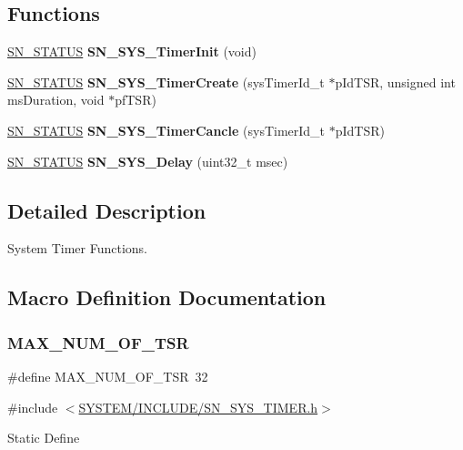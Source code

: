 \subsection*{Functions}
\begin{DoxyCompactItemize}
\item 
\mbox{\label{group__SYSTEM__TIMER_gabe15a62b1e228b796d3a2297c085c9ef}} 
\hyperlink{group__SYSTEM__ERROR_ga4540713b9a7a18ce44d78c3a10f7442f}{S\+N\+\_\+\+S\+T\+A\+T\+US} {\bfseries S\+N\+\_\+\+S\+Y\+S\+\_\+\+Timer\+Init} (void)
\item 
\mbox{\label{group__SYSTEM__TIMER_ga1d85ad6b65ffc1c7a3fd35361b33aa08}} 
\hyperlink{group__SYSTEM__ERROR_ga4540713b9a7a18ce44d78c3a10f7442f}{S\+N\+\_\+\+S\+T\+A\+T\+US} {\bfseries S\+N\+\_\+\+S\+Y\+S\+\_\+\+Timer\+Create} (sys\+Timer\+Id\+\_\+t $\ast$p\+Id\+T\+SR, unsigned int ms\+Duration, void $\ast$pf\+T\+SR)
\item 
\mbox{\label{group__SYSTEM__TIMER_gaa004347fdd0940a882a77729feaf60c4}} 
\hyperlink{group__SYSTEM__ERROR_ga4540713b9a7a18ce44d78c3a10f7442f}{S\+N\+\_\+\+S\+T\+A\+T\+US} {\bfseries S\+N\+\_\+\+S\+Y\+S\+\_\+\+Timer\+Cancle} (sys\+Timer\+Id\+\_\+t $\ast$p\+Id\+T\+SR)
\item 
\mbox{\label{group__SYSTEM__TIMER_ga4cf64b0280d940416955ba171ed339aa}} 
\hyperlink{group__SYSTEM__ERROR_ga4540713b9a7a18ce44d78c3a10f7442f}{S\+N\+\_\+\+S\+T\+A\+T\+US} {\bfseries S\+N\+\_\+\+S\+Y\+S\+\_\+\+Delay} (uint32\+\_\+t msec)
\end{DoxyCompactItemize}


\subsection{Detailed Description}
System Timer Functions. 



\subsection{Macro Definition Documentation}
\mbox{\label{group__SYSTEM__TIMER_gad99ad563a1a632fde508ad8be6422e57}} 
\subsubsection{\texorpdfstring{M\+A\+X\+\_\+\+N\+U\+M\+\_\+\+O\+F\+\_\+\+T\+SR}{MAX\_NUM\_OF\_TSR}}
{\footnotesize\ttfamily \#define M\+A\+X\+\_\+\+N\+U\+M\+\_\+\+O\+F\+\_\+\+T\+SR~32}



{\ttfamily \#include $<$\hyperlink{SN__SYS__TIMER_8h}{S\+Y\+S\+T\+E\+M/\+I\+N\+C\+L\+U\+D\+E/\+S\+N\+\_\+\+S\+Y\+S\+\_\+\+T\+I\+M\+E\+R.\+h}$>$}

Static Define 